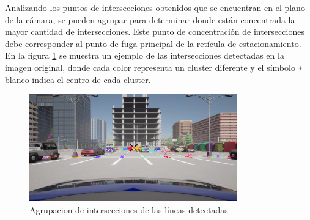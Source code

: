 Analizando los puntos de intersecciones obtenidos que se encuentran en el plano de la cámara, se pueden agrupar para determinar donde están
concentrada la mayor cantidad de intersecciones.
Este punto de concentración de intersecciones debe corresponder al punto de fuga principal de la retícula de estacionamiento.
En la figura \ref{fig:intersections} se muestra un ejemplo de las intersecciones detectadas en la imagen original,
donde cada color representa un cluster diferente y el símbolo \texttt{+} blanco indica el centro de cada cluster.
\\

\begin{figure}[!ht]
    \centering
    \includegraphics[width=0.8\textwidth]{img/reticule/svd-km}
    \caption{Agrupacion de intersecciones de las líneas detectadas}
    \label{fig:intersections}
\end{figure}

